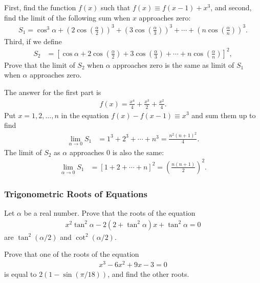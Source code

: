 \documentclass[12pt,a4paper]{memoir}
\theoremstyle{definition}
\begin{document}
\begin{question}
	First, find the function $f(x)$ such that $f(x) \equiv f(x-1) + x^3$, and second, find the limit of the following sum when $x$ approaches zero:
	\begin{align*}
		S_1 =\cos^3 \alpha + \left(2\cos\left(\frac{\alpha}{2}\right)\right)^3 + \left(3\cos\left(\frac{\alpha}{3}\right)\right)^3 + \cdots + \left(n\cos\left(\frac{\alpha}{n}\right)\right)^3.
	\end{align*}
	Third, if we define
	\begin{align*}
		S_2 &= \left[\cos \alpha + 2\cos\left(\frac{\alpha}{2}\right) + 3\cos\left(\frac{\alpha}{3}\right) + \cdots + n\cos\left(\frac{\alpha}{n}\right)\right]^2,
	\end{align*}
	Prove that the limit of $S_2$ when $\alpha$ approaches zero is the same as limit of $S_1$ when $\alpha$ approaches zero.
\end{question}

\begin{solution}
	The answer for the first part is 
	\begin{align*}
		f(x) = \frac{x^4}{4} + \frac{x^3}{2} + \frac{x^2}{4}.
	\end{align*}
	Put $x=1,2,\dots,n$ in the equation $f(x)-f(x-1) \equiv x^3$ and sum them up to find
	\begin{align*}
		\lim_{\alpha \to 0} S_1 &= 1^3 + 2^3 + \cdots + n^3 = \frac{n^2(n+1)^2}{4}.
	\end{align*}
	The limit of $S_2$ as $\alpha$ approaches $0$ is also the same:
	\begin{align*}
		\lim_{\alpha \to 0} S_1 &= \left[1 + 2 + \cdots + n \right]^2 = \left(\frac{n(n+1)}{2}\right)^2.
	\end{align*}
\end{solution}

\subsubsection{Trigonometric Roots of Equations}
\begin{question}
	Let $\alpha$ be a real number. Prove that the roots of the equation
	\begin{align*}
		x^2\tan^2\alpha - 2(2+\tan^2\alpha)x + \tan^2\alpha = 0
	\end{align*}
	are $\tan^2(\alpha/2)$ and $\cot^2(\alpha/2)$.
\end{question}

\begin{question}
	Prove that one of the roots of the equation
	\begin{align*}
		x^3-6x^2+9x-3=0
	\end{align*}
	is equal to $2(1-\sin(\pi/18))$, and find the other roots.
\end{question}
\end{document}
